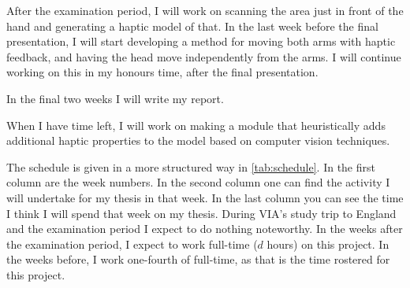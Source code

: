 \documentclass[10pt, a4paper]{article}
\begin{document}
\begin{multicols}{2}
After the examination period, I will work on scanning the area just in front
of the hand and generating a haptic model of that.  In the last week before the
final presentation, I will start developing a method for moving both arms with
haptic feedback, and having the head move independently from the arms.  I will
continue working on this in my honours time, after the final presentation.

In the final two weeks I will write my report.

When I have time left, I will work on making a module that heuristically adds 
additional haptic properties to the model based on computer vision techniques.

The schedule is given in a more structured way in \autoref{tab:schedule}.  In
the first column are the week numbers. In the second column one can find the
activity I will undertake for my thesis in that week.  In the last column you
can see the time I think I will spend that week on my thesis.  During VIA's
study trip to England and the examination period I expect to do nothing
noteworthy.  In the weeks after the examination period, I expect to work
full-time ($d$ hours) on this project. In the weeks before, I work one-fourth
of full-time, as that is the time rostered for this project.



\end{multicols}
\end{document}
